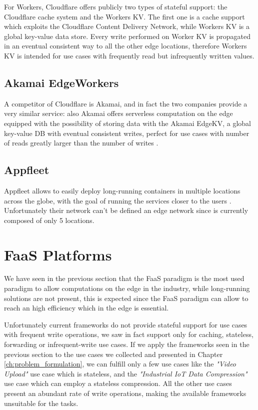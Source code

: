 For Workers, Cloudflare offers publicly two types of stateful support: the Cloudflare cache system and the Workers KV. The first one is a cache support which exploits the Cloudflare Content Delivery Network, while Workers KV is a global key-value data store. Every write performed on Worker KV is propagated in an eventual consistent way to all the other edge locations, therefore Workers KV is intended for use cases with frequently read but infrequently written values.


\subsection{Akamai EdgeWorkers}
A competitor of Cloudflare is Akamai, and in fact the two companies provide a very similar service: also Akamai offers serverless computation on the edge equipped with the possibility of storing data with the Akamai EdgeKV, a global key-value DB with eventual consistent writes, perfect for use cases with number of reads greatly larger than the number of writes \cite{akamai-edge-workers}.


\subsection{Appfleet}
Appfleet allows to easily deploy long-running containers in multiple locations across the globe, with the goal of running the services closer to the users \cite{appfleet}. Unfortunately their network can't be defined an edge network since is currently composed of only 5 locations.


\section{FaaS Platforms}
We have seen in the previous section that the FaaS paradigm is the most used paradigm to allow computations on the edge in the industry, while long-running solutions are not present, this is expected since the FaaS paradigm can allow to reach an high efficiency which in the edge is essential.

Unfortunately current frameworks do not provide stateful support for use cases with frequent write operations, we saw in fact support only for caching, stateless, forwarding or infrequent-write use cases.
If we apply the frameworks seen in the previous section to the use cases we collected and presented in Chapter \ref{ch:problem_formulation}, we can fulfill only a few use cases like the \textit{"Video Upload"} use case which is stateless, and the \textit{"Industrial IoT Data Compression"} use case which can employ a stateless compression. All the other use cases present an abundant rate of write operations, making the available frameworks unsuitable for the tasks.

